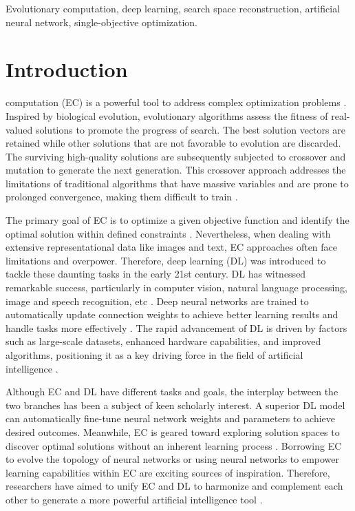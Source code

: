 \documentclass[journal,twoside]{IEEEtran}
\begin{document}
\begin{IEEEkeywords}
	Evolutionary computation, deep learning, search space reconstruction, artificial neural network, single-objective optimization.
\end{IEEEkeywords}

\IEEEpeerreviewmaketitle

\section{Introduction}
 computation (EC) is a powerful tool to address complex optimization problems \cite{eiben2015evolutionary}. Inspired by biological evolution, evolutionary algorithms assess the fitness of real-valued solutions to promote the progress of search. The best solution vectors are retained while other solutions that are not favorable to evolution are discarded. The surviving high-quality solutions are subsequently subjected to crossover and mutation to generate the next generation. This crossover approach addresses the limitations of traditional algorithms that have massive variables and are prone to prolonged convergence, making them difficult to train \cite{li2023machine}.

The primary goal of EC is to optimize a given objective function and identify the optimal solution within defined constraints \cite{Shangcegao2019chaotic}. Nevertheless, when dealing with extensive representational data like images and text, EC approaches often face limitations and overpower. Therefore, deep learning (DL) was introduced to tackle these daunting tasks in the early 21st century. DL has witnessed remarkable success, particularly in computer vision, natural language processing, image and speech recognition, etc \cite{Boiko2023}. Deep neural networks are trained to automatically update connection weights to achieve better learning results and handle tasks more effectively \cite{lee2022complex}. The rapid advancement of DL is driven by factors such as large-scale datasets, enhanced hardware capabilities, and improved algorithms, positioning it as a key driving force in the field of artificial intelligence \cite{9552976, ma2023estimating}.

Although EC and DL have different tasks and goals, the interplay between the two branches has been a subject of keen scholarly interest. A superior DL model can automatically fine-tune neural network weights and parameters to achieve desired outcomes. Meanwhile, EC is geared toward exploring solution spaces to discover optimal solutions without an inherent learning process \cite{lei2023chaotic}. Borrowing EC to evolve the topology of neural networks or using neural networks to empower learning capabilities within EC are exciting sources of inspiration. Therefore, researchers have aimed to unify EC and DL to harmonize and complement each other to generate a more powerful artificial intelligence tool \cite{yu2021improving}.
\end{document}
